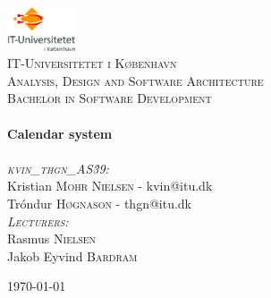 \begin{titlepage}
\begin{center}

\includegraphics[width=0.15\textwidth]{./logo}~\\[1cm]

\textsc{\LARGE IT-Universitetet i København}\\[1.5cm]

\textsc{\Large Analysis, Design and Software Architecture}\\[0.5cm]
\textsc{Bachelor in Software Development}\\[0.5cm]

\HRule \\[0.4cm]
{ \huge \bfseries Calendar system \\[0.4cm] }
\HRule \\[1.5cm]

\textsc{\LARGE \emph{kvin\_thgn\_AS\.39:}}\\
\vspace{2 mm}
\large
Kristian \textsc{Mohr Nielsen} - kvin@itu.dk\\
Tróndur \textsc{Høgnason} - thgn@itu.dk\\
\vspace{10 mm}
\large
\textsc{\large \emph{Lecturers:}}\\
\vspace{1 mm}
Rasmus \textsc{Nielsen} \\
Jakob Eyvind \textsc{Bardram}

\vfill

{\large \today}
\end{center}
\end{titlepage}
